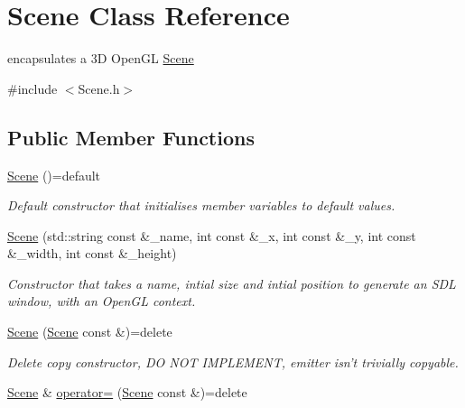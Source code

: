\hypertarget{classScene}{\section{Scene Class Reference}
\label{classScene}
}


encapsulates a 3\-D Open\-G\-L \hyperlink{classScene}{Scene}  




{\ttfamily \#include $<$Scene.\-h$>$}

\subsection*{Public Member Functions}
\begin{DoxyCompactItemize}
\item 
\hypertarget{classScene_a93ccc41b0a2f6c24e467d5d9de76ec0d}{\hyperlink{classScene_a93ccc41b0a2f6c24e467d5d9de76ec0d}{Scene} ()=default}\label{classScene_a93ccc41b0a2f6c24e467d5d9de76ec0d}

\begin{DoxyCompactList}\small\item\em Default constructor that initialises member variables to default values. \end{DoxyCompactList}\item 
\hyperlink{classScene_acae65db27253defb67bb4a7f55dda339}{Scene} (std\-::string const \&\-\_\-name, int const \&\-\_\-x, int const \&\-\_\-y, int const \&\-\_\-width, int const \&\-\_\-height)
\begin{DoxyCompactList}\small\item\em Constructor that takes a name, intial size and intial position to generate an S\-D\-L window, with an Open\-G\-L context. \end{DoxyCompactList}\item 
\hypertarget{classScene_a6f6ba16bcbbf24d7f16df251b0a2ae3d}{\hyperlink{classScene_a6f6ba16bcbbf24d7f16df251b0a2ae3d}{Scene} (\hyperlink{classScene}{Scene} const \&)=delete}\label{classScene_a6f6ba16bcbbf24d7f16df251b0a2ae3d}

\begin{DoxyCompactList}\small\item\em Delete copy constructor, D\-O N\-O\-T I\-M\-P\-L\-E\-M\-E\-N\-T, emitter isn't trivially copyable. \end{DoxyCompactList}\item 
\hypertarget{classScene_a09aee6d6de84d1471e0300411e9d0df7}{\hyperlink{classScene}{Scene} \& \hyperlink{classScene_a09aee6d6de84d1471e0300411e9d0df7}{operator=} (\hyperlink{classScene}{Scene} const \&)=delete}\label{classScene_a09aee6d6de84d1471e0300411e9d0df7}


\end{DoxyCompactItemize}
